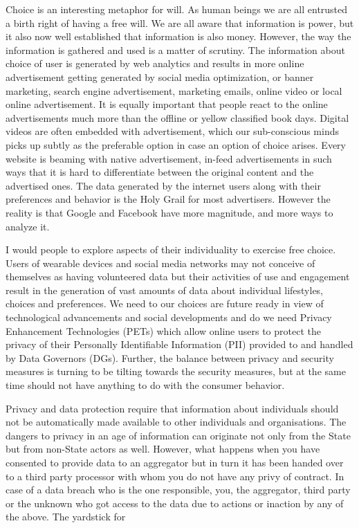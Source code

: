 \begin{multicols}{2}
Choice is an interesting metaphor for will. As human beings we are all entrusted a birth right of having a free will. We are all aware that information is power, but it also now well established that information is also money. However, the way the information is gathered and used is a matter of scrutiny. The information about choice of user is generated by web analytics and results in more online advertisement getting generated by social media optimization, or banner marketing, search engine advertisement, marketing emails, online video or local online advertisement. It is equally important that people react to the online advertisements much more than the offline or yellow classified book days. Digital videos are often embedded with advertisement, which our sub-conscious minds picks up subtly as the preferable option in case an option of choice arises. Every website is beaming with native advertisement, in-feed advertisements in such ways that it is hard to differentiate between the original content and the advertised ones. The data generated by the internet users along with their preferences and behavior is the Holy Grail for most advertisers. However the reality is that Google and Facebook have more magnitude, and more ways to analyze it. 

I would people to explore aspects of their individuality to exercise free choice. Users of wearable devices and social media networks may not conceive of themselves as having volunteered data but their activities of use and engagement result in the generation of vast amounts of data about individual lifestyles, choices and preferences. We need to our choices are future ready in view of technological advancements and social developments and do we need Privacy Enhancement Technologies (PETs) which allow online users to protect the privacy of their Personally Identifiable Information (PII) provided to and handled by Data Governors (DGs). Further, the balance between privacy and security measures is turning to be tilting towards the security measures, but at the same time should not have anything to do with the consumer behavior. 

Privacy and data protection require that information about individuals should not be automatically made available to other individuals and organisations. The dangers to privacy in an age of information can originate not only from the State but from non-State actors as well. However, what happens when you have consented to provide data to an aggregator but in turn it has been handed over to a third party processor with whom you do not have any privy of contract. In case of a data breach who is the one responsible, you, the aggregator, third party or the unknown who got access to the data due to actions or inaction by any of the above. The yardstick for 


\end{multicols}
